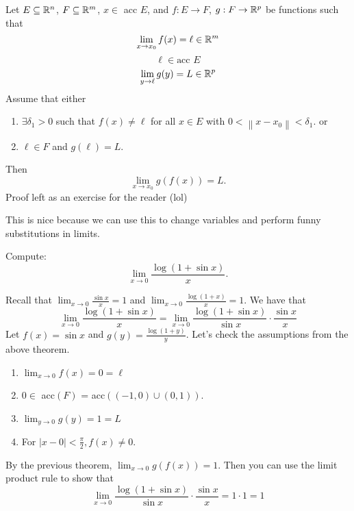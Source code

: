 \documentclass[11pt]{article}
\newcommand{\norm}[1]{\left\lVert #1 \right\rVert}
\newcommand{\ra}{\rightarrow}
\newcommand{\sse}{\subseteq}
\begin{document}
\begin{theorem}
    Let $E \sse \R^n$, $F \subseteq \mathbb{R}^m$, $x \in$ acc $E$, and $f: E \ra F$, $g: F \ra \R^p$ be functions such that \[\lim_{x \ra x_0} f(x) = \ell \in \R^m\]
    \[\ell \in \text{acc } E\]
    \[\lim_{y \ra \ell} g(y) = L \in \R^p\]
    Assume that either 
    \begin{enumerate}[label = (\roman*)]
        \item $\exists \delta_1 > 0$ such that $f(x) \neq \ell$ for all $x \in E$ with $0 < \norm{x - x_0} < \delta_1$. or
        \item $\ell \in F$ and $g(\ell) = L$.
    \end{enumerate}
    Then \[\lim_{x \ra x_0} g(f(x)) = L.\]
    Proof left as an exercise for the reader (lol)
\end{theorem}

\begin{remark}
    This is nice because we can use this to change variables and perform funny substitutions in limits. 
\end{remark}

\begin{example}
    Compute:
    \[\lim_{x \ra 0}\frac{\log{(1 + \sin{x})}}{x}.\]
    \begin{solution}
        Recall that $\lim_{x \ra 0}\frac{\sin{x}}{x} = 1$ and $\lim_{x \ra 0} \frac{\log(1 + x)}{x} = 1$.
        We have that 
        \[\lim_{x \ra 0}\frac{\log{(1 + \sin{x})}}{x} = \lim_{x \ra 0}\frac{\log{(1 + \sin{x})}}{\sin{x}}\cdot \frac{\sin{x}}{x}\]
        Let $f(x) = \sin{x}$ and $g(y) = \frac{\log{(1 + y)}}{y}$. Let's check the assumptions from the above theorem.
        \begin{enumerate}[label = (\roman*)]
            \item $\displaystyle{\lim_{x \ra 0} f(x) = 0 = \ell}$
            \item $0 \in$ acc$(F)$ = acc$((-1,0) \cup (0,1))$.
            \item $\displaystyle{\lim_{y \ra 0}g(y) = 1 = L}$
            \item For $|x - 0| < \frac{\pi}{2}, f(x) \neq 0$. 
        \end{enumerate}
        By the previous theorem, $\displaystyle{\lim_{x \ra 0} g(f(x)) = 1}$. Then you can use the limit product rule to show that \[\lim_{x \ra 0}\frac{\log{(1 + \sin{x})}}{\sin{x}}\cdot \frac{\sin{x}}{x} = 1 \cdot 1 = \boxed{1}\]
    \end{solution}
\end{example}
\newpage
\end{document}
